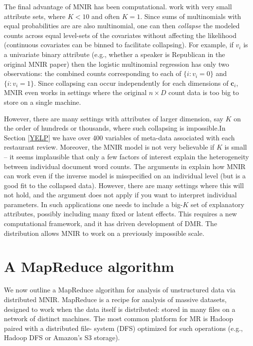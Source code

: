 \documentclass[12pt]{article}
\newcommand{\bm}[1]{\mathbf{#1}}
\begin{document}
The final advantage of MNIR has been computational.
\cite{taddy_multinomial_2013,taddy_measuring_2013} work with very small
attribute sets, where $K<10$ and often $K=1$.  Since sums of multinomials with
equal probabilities are are also multinomial, one can then {\it collapse} the
modeled counts across equal level-sets of the covariates without affecting the
likelihood (continuous covariates can be binned to facilitate collapsing).
For example, if $v_i$ is a univariate binary attribute (e.g., whether a
speaker is Republican in the original MNIR paper) then the logistic multinomial regression
  has only two observations: the combined counts
corresponding to each of $\{i:v_i=0\}$ and $\{i:v_i=1\}$. Since collapsing can
occur independently for each dimensions of $\bm{c}_i$,  MNIR  even
works in settings where the original $n\times D$ count data is too big to
store on a single machine.

However, there are many settings with attributes of  larger dimension, say $K$
on the order of hundreds or thousands, where such collapsing is impossible.In
Section \ref{YELP} we have over 400 variables of meta-data associated with
each restaurant review.  Moreover,  the MNIR model is not very believable if
$K$ is small -- it seems implausible that only a few factors of interest
explain the heterogeneity between individual document word counts. The
arguments in \cite{taddy_multinomial_2013,taddy_rejoinder:_2013} explain how
MNIR can work even if the inverse model is misspecified on an individual level
(but is a good fit to the collapsed data).  However, there are many settings
where this will not hold, and the argument does not apply if you want to
interpret individual parameters. In such applications one needs to
include a big-$K$ set of explanatory attributes, possibly including many fixed
or latent effects.   This requires a new computational framework, and it has
driven development of DMR.  The distribution allows MNIR to work on a
previously impossible scale.

\section{A MapReduce algorithm} 
\label{MR}

We now outline a MapReduce algorithm for analysis of unstructured  data via
distributed MNIR.   MapReduce \citep[MR;][]{dean_mapreduce:_2004} is a  recipe
for analysis of massive datasets, designed to work when the data itself is
distributed: stored in many files on a network of distinct machines.
The most common platform for  MR is Hadoop paired with a distributed file-
system (DFS)  optimized for such operations (e.g., Hadoop DFS or
Amazon's S3 storage).
\end{document}
